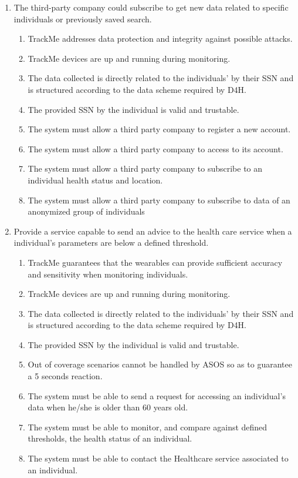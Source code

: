 \documentclass[hidelinks, 12pt]{report}
\newcommand\requirement[1]{\item[{[R#1]}] }
\newcommand\goal[1]{\item[{[G#1]}] }
\newcommand\assumption[1]{\item[{[D#1]}] }
\begin{document}
\begin{enumerate}
   \goal{4} The third-party company could subscribe to get new data related to specific individuals or previously saved search.
    \begin{enumerate}
      \assumption{2} TrackMe addresses data protection and integrity against possible attacks.
      \assumption{3} TrackMe devices are up and running during monitoring.
      \assumption{4} The data collected is directly related to the individuals' by their SSN and is structured according to the data scheme required by D4H.
      \assumption{5} The provided SSN by the individual is valid and trustable.
      \requirement{5} The system must allow a third party company to register a new account.
      \requirement{6} The system must allow a third party company to access to its account.
      \requirement{11} The system must allow a third party company to subscribe to an individual health status and location.
      \requirement{12} The system must allow a third party company to subscribe to data of an anonymized group of individuals
    \end{enumerate}

   \goal{5} Provide a service capable to send an advice to the health care service when a individual's parameters are below a defined threshold.
    \begin{enumerate}
      \assumption{1} TrackMe guarantees that the wearables can provide sufficient accuracy and sensitivity when monitoring individuals.
      \assumption{3} TrackMe devices are up and running during monitoring.
      \assumption{4} The data collected is directly related to the individuals' by their SSN and is structured according to the data scheme required by D4H.
      \assumption{5} The provided SSN by the individual is valid and trustable.
	  \assumption{6} Out of coverage scenarios cannot be handled by ASOS so as to guarantee a 5 seconds reaction.
      \requirement{13} The system must be able to send a request for accessing an individual's data when he/she is older than 60 years old.
      \requirement{14} The system must be able to monitor, and compare against defined thresholds, the health status of an individual.
      \requirement{15} The system must be able to contact the Healthcare service associated to an individual.      
  \end{enumerate}
  

\end{enumerate}
\end{document}
